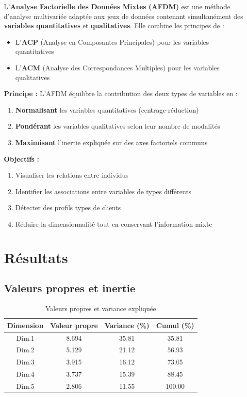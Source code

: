 \documentclass[12pt,a4paper]{article}
\begin{document}
L'\textbf{Analyse Factorielle des Données Mixtes (AFDM)} est une méthode d'analyse multivariée adaptée aux jeux de données contenant simultanément des \textbf{variables quantitatives} et \textbf{qualitatives}. Elle combine les principes de :

\begin{itemize}
    \item L'\textbf{ACP} (Analyse en Composantes Principales) pour les variables quantitatives
    \item L'\textbf{ACM} (Analyse des Correspondances Multiples) pour les variables qualitatives
\end{itemize}

\textbf{Principe :} L'AFDM équilibre la contribution des deux types de variables en :
\begin{enumerate}
    \item \textbf{Normalisant} les variables quantitatives (centrage-réduction)
    \item \textbf{Pondérant} les variables qualitatives selon leur nombre de modalités
    \item \textbf{Maximisant} l'inertie expliquée sur des axes factoriels communs
\end{enumerate}

\textbf{Objectifs :}
\begin{enumerate}
    \item Visualiser les relations entre individus
    \item Identifier les associations entre variables de types différents
    \item Détecter des profils types de clients
    \item Réduire la dimensionnalité tout en conservant l'information mixte
\end{enumerate}

\section{Résultats}

\subsection{Valeurs propres et inertie}

\begin{table}[H]
\centering
\caption{Valeurs propres et variance expliquée}
\begin{tabular}{|c|c|c|c|}
\hline
\textbf{Dimension} & \textbf{Valeur propre} & \textbf{Variance (\%)} & \textbf{Cumul (\%)} \\
\hline
Dim.1 & 8.694 & 35.81 & 35.81 \\
Dim.2 & 5.129 & 21.12 & 56.93 \\
Dim.3 & 3.915 & 16.12 & 73.05 \\
Dim.4 & 3.737 & 15.39 & 88.45 \\
Dim.5 & 2.806 & 11.55 & 100.00 \\
\hline
\end{tabular}
\end{table}
\end{document}
